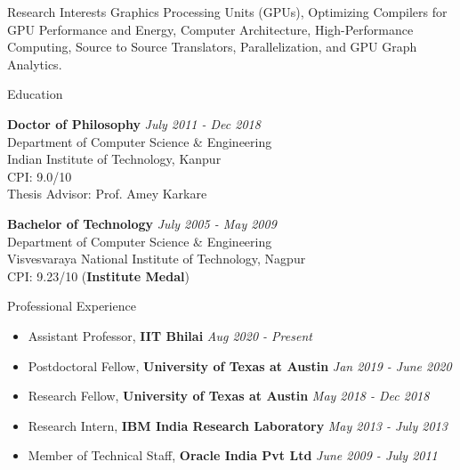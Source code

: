 \documentclass{resume} %
\begin{document}

\begin{rSection}{Research Interests}
	Graphics Processing Units (GPUs), Optimizing Compilers for GPU Performance and Energy, Computer Architecture, High-Performance Computing, Source to Source Translators, Parallelization, and  GPU Graph Analytics.
\end{rSection}


\begin{rSection}{Education}

{\bf Doctor of Philosophy} \hfill {\em July 2011 - Dec 2018} \\ 
Department of Computer Science \& Engineering \\
Indian Institute of Technology, Kanpur \\
CPI: 9.0/10 \\
Thesis Advisor: Prof. Amey Karkare


{\bf Bachelor of Technology} \hfill {\em July 2005 - May 2009}  \\
Department of Computer Science \& Engineering \\
Visvesvaraya National Institute of Technology, Nagpur \\
CPI: 9.23/10 (\textbf{Institute Medal})


\end{rSection}


\begin{rSection}{Professional Experience}
	\begin{itemize}
		\item Assistant Professor, \textbf{IIT Bhilai} \hfill {\em Aug 2020 - Present}
		\item Postdoctoral Fellow, \textbf{University of Texas at Austin}  \hfill {\em Jan 2019 - June 2020}
		\item Research Fellow, \textbf{University of Texas at Austin} \hfill{\em May 2018 - Dec 2018}
		\item Research Intern, \textbf{IBM India Research Laboratory} \hfill{\em May 2013 - July 2013}
		\item Member of Technical Staff, \textbf{Oracle India Pvt Ltd} \hfill{\em June 2009 - July 2011}
	\end{itemize}
\end{rSection}
\end{document}
